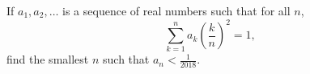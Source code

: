 If $a_1, a_2, \ldots$ is a sequence of real numbers such that for all $n$, $$\sum_{k = 1}^n a_k \left( \frac{k}{n} \right)^2 = 1,$$find the smallest $n$ such that $a_n < \frac{1}{2018}$.